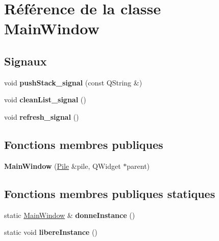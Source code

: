 \hypertarget{class_main_window}{\section{Référence de la classe Main\-Window}
\label{class_main_window}
}
\subsection*{Signaux}
\begin{DoxyCompactItemize}
\item 
\hypertarget{class_main_window_a1e39eccc1e017799bda6b446b8280edf}{void {\bfseries push\-Stack\-\_\-signal} (const Q\-String \&)}\label{class_main_window_a1e39eccc1e017799bda6b446b8280edf}

\item 
\hypertarget{class_main_window_aed37073752de791b6ad06e41a8e9f1b2}{void {\bfseries clean\-List\-\_\-signal} ()}\label{class_main_window_aed37073752de791b6ad06e41a8e9f1b2}

\item 
\hypertarget{class_main_window_a94d40675237489fc9d25ccc868a4dcbd}{void {\bfseries refresh\-\_\-signal} ()}\label{class_main_window_a94d40675237489fc9d25ccc868a4dcbd}

\end{DoxyCompactItemize}
\subsection*{Fonctions membres publiques}
\begin{DoxyCompactItemize}
\item 
\hypertarget{class_main_window_ac8603055e732d11c01cfa8e44bff3ca2}{{\bfseries Main\-Window} (\hyperlink{class_pile}{Pile} \&pile, Q\-Widget $\ast$parent)}\label{class_main_window_ac8603055e732d11c01cfa8e44bff3ca2}

\end{DoxyCompactItemize}
\subsection*{Fonctions membres publiques statiques}
\begin{DoxyCompactItemize}
\item 
\hypertarget{class_main_window_a1dc154d1435cc7672dd35e82d3c466d4}{static \hyperlink{class_main_window}{Main\-Window} \& {\bfseries donne\-Instance} ()}\label{class_main_window_a1dc154d1435cc7672dd35e82d3c466d4}

\item 
\hypertarget{class_main_window_a67c2ee9b42435ed8bd98bcb194fc140d}{static void {\bfseries libere\-Instance} ()}\label{class_main_window_a67c2ee9b42435ed8bd98bcb194fc140d}

\end{DoxyCompactItemize}
